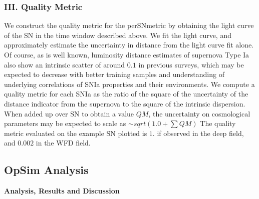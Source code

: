 \subsubsection{III. Quality Metric}
We construct the quality metric for the perSNmetric by obtaining the light curve of the SN
in the time window described above. We fit the light curve, and approximately estimate the
uncertainty in distance from the light curve fit alone. Of course, as is well known,
luminosity distance estimates of supernova Type Ia also show an intrinsic scatter of
around $0.1$ in previous surveys, which may be expected to decrease with better training
samples and understanding of underlying correlations of SNIa properties and their
environments. We compute a quality metric for each SNIa as the ratio of the square of the
uncertainty of the distance indicator from the supernova to the square of the intrinsic
dispersion. When added up over SN to obtain a value $QM$, the uncertainty on cosmological
parameters may be expected to scale as $\sim sqrt(1.0 + \sum QM)$ The quality metric evaluated on 
the example SN plotted is $1.$ if observed in the deep field, and $0.002$ in
the WFD field.





\subsection{OpSim Analysis}
\label{sec:\secname:analysis}


{\bf Analysis, Results and Discussion}


